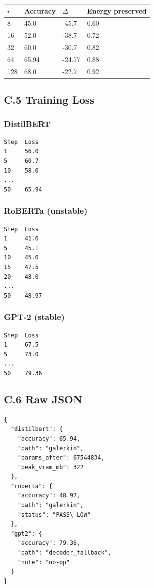 \begin{table}[H]
\centering
\small
\begin{tabular}{llll}
\toprule
\textbf{$r$} & \textbf{Accuracy} & \textbf{$\Delta$} & \textbf{Energy preserved} \\
\midrule
8 & 45.0 & -45.7 & 0.60 \\
16 & 52.0 & -38.7 & 0.72 \\
32 & 60.0 & -30.7 & 0.82 \\
64 & 65.94 & -24.77 & 0.88 \\
128 & 68.0 & -22.7 & 0.92 \\
\bottomrule
\end{tabular}
\end{table}

\subsection{C.5 Training Loss}

\subsubsection{DistilBERT}

\begin{lstlisting}
Step  Loss
1     56.0
5     60.7
10    58.0
...
50    65.94
\end{lstlisting}

\subsubsection{RoBERTa (unstable)}

\begin{lstlisting}
Step  Loss
1     41.6
5     45.1
10    45.0
15    47.5
20    48.0
...
50    48.97
\end{lstlisting}

\subsubsection{GPT-2 (stable)}

\begin{lstlisting}
Step  Loss
1     67.5
5     73.0
...
50    79.36
\end{lstlisting}

\subsection{C.6 Raw JSON}

\begin{lstlisting}
{
  "distilbert": {
    "accuracy": 65.94,
    "path": "galerkin",
    "params_after": 67544834,
    "peak_vram_mb": 322
  },
  "roberta": {
    "accuracy": 48.97,
    "path": "galerkin",
    "status": "PASS\_LOW"
  },
  "gpt2": {
    "accuracy": 79.36,
    "path": "decoder_fallback",
    "note": "no-op"
  }
}
\end{lstlisting}

